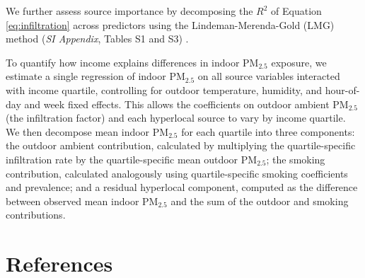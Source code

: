 \documentclass[9pt,twocolumn,twoside]{pnas-new}
\begin{document}
We further assess source importance by decomposing the $R^2$ of Equation \ref{eq:infiltration} across predictors using the Lindeman-Merenda-Gold (LMG) method (\textit{SI Appendix}, Tables S1 and S3) \citep{lindeman_introduction_1980, gromping_relative_2006}.


To quantify how income explains differences in indoor PM$_{2.5}$ exposure, we estimate a single regression of indoor PM$_{2.5}$ on all source variables interacted with income quartile, controlling for outdoor temperature, humidity, and hour-of-day and week fixed effects. This allows the coefficients on outdoor ambient PM$_{2.5}$ (the infiltration factor) and each hyperlocal source to vary by income quartile. We then decompose mean indoor PM$_{2.5}$ for each quartile into three components: the outdoor ambient contribution, calculated by multiplying the quartile-specific infiltration rate by the quartile-specific mean outdoor PM$_{2.5}$; the smoking contribution, calculated analogously using quartile-specific smoking coefficients and prevalence; and a residual hyperlocal component, computed as the difference between observed mean indoor PM$_{2.5}$ and the sum of the outdoor and smoking contributions.


\showacknow{} 
\vspace{1cm}
\section*{References}



\end{document}
